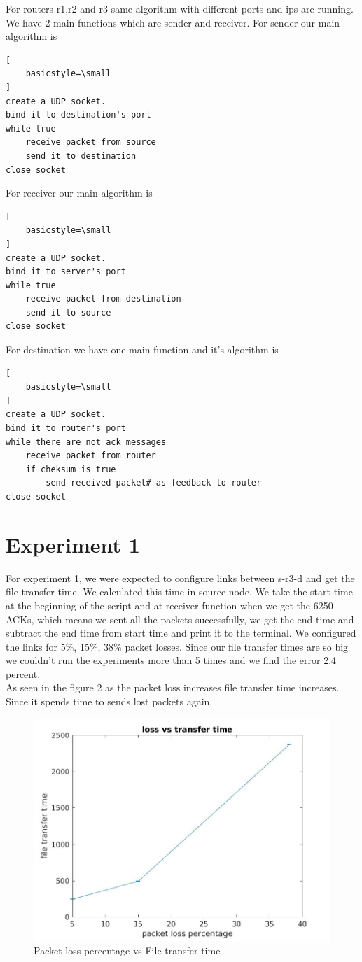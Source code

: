 \documentclass[conference]{IEEEtran}
\begin{document}
For routers r1,r2 and r3 same algorithm with different ports and ips are running. We have 2 main functions which are sender and receiver. For sender our main algorithm is 
\begin{lstlisting}[
    basicstyle=\small
]
create a UDP socket.
bind it to destination's port
while true
    receive packet from source
    send it to destination
close socket
\end{lstlisting}
For receiver our main algorithm is 
\begin{lstlisting}[
    basicstyle=\small
]
create a UDP socket.
bind it to server's port
while true
    receive packet from destination
    send it to source
close socket
\end{lstlisting}

For destination we have one main function and it's algorithm is 
\begin{lstlisting}[
    basicstyle=\small
]
create a UDP socket.
bind it to router's port
while there are not ack messages
    receive packet from router
    if cheksum is true
        send received packet# as feedback to router
close socket
\end{lstlisting}

\section{Experiment 1}
For experiment 1, we were expected to configure links between s-r3-d and get the file transfer time. We calculated this time in source node. We take the start time at the beginning of the script and at receiver function when we get the 6250 ACKs, which means we sent all the packets successfully, we get the end time and subtract the end time from start time and print it to the terminal. We configured the links for 5\%, 15\%, 38\% packet losses. 
Since our file transfer times are so big we couldn't run the experiments more than 5 times and we find the error 2.4 percent. \\
As seen in the figure 2 as the packet loss increases file transfer time increases. Since it spends time to sends lost packets again.
\begin{figure}[h]
\includegraphics[scale = 0.32]{netpar2ex1.jpg}
\caption{Packet loss percentage vs File transfer time}
\end{figure}
 \FloatBarrier
\end{document}
